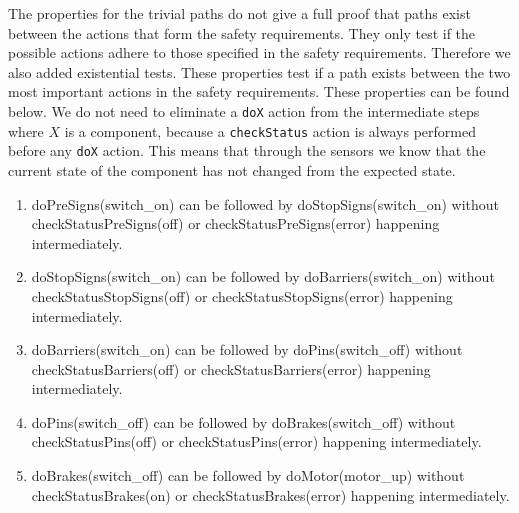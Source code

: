     The properties for the trivial paths do not give a full proof that paths exist between the actions that form the safety requirements. 
    They only test if the possible actions adhere to those specified in the safety requirements. 
    Therefore we also added existential tests. 
    These properties test if a path exists between the two most important actions in the safety requirements. 
    These properties can be found below.
    We do not need to eliminate a \texttt{doX} action from the intermediate steps where $X$ is a component,
    because a \texttt{checkStatus} action is always performed before any \texttt{doX} action.
    This means that through the sensors we know that the current state of the component has not changed from the expected state.
    
    \begin{enumerate}
    
    
    	\item doPreSigns(switch\_on) can be followed by doStopSigns(switch\_on) without checkStatusPreSigns(off) or checkStatusPreSigns(error) happening intermediately.
    	
    	
    	
    	\item doStopSigns(switch\_on) can be followed by doBarriers(switch\_on) without checkStatusStopSigns(off) or checkStatusStopSigns(error) happening intermediately.
    	
    	
    	
    	\item doBarriers(switch\_on) can be followed by doPins(switch\_off) without checkStatusBarriers(off) or checkStatusBarriers(error) happening intermediately.
    	
    	
    	
    	\item doPins(switch\_off) can be followed by doBrakes(switch\_off) without checkStatusPins(off) or checkStatusPins(error) happening intermediately. 
    	
    	
    	\item doBrakes(switch\_off) can be followed by doMotor(motor\_up) without checkStatusBrakes(on) or checkStatusBrakes(error) happening intermediately.
    	
    	

\end{enumerate}
